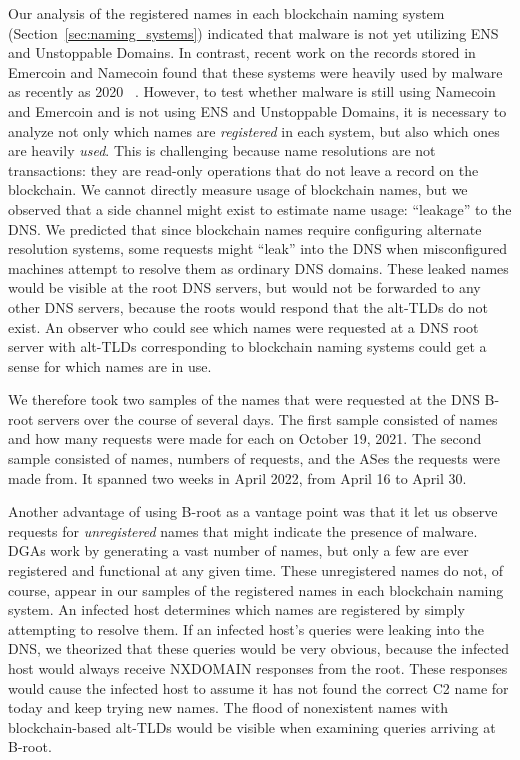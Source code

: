 Our analysis of the registered names in each blockchain naming system 
(Section~\ref{sec:naming_systems}) indicated that malware is not yet utilizing 
ENS and Unstoppable Domains. In contrast, recent work on the 
records stored in 
Emercoin and Namecoin found that these systems were heavily 
used by malware as recently as 2020 
~\cite{casino_unearthing_2021}. 
However, to test whether malware is still using Namecoin and Emercoin and is 
not using ENS and Unstoppable Domains, it is necessary to 
analyze not only which names are 
\emph{registered} in each system, but also which ones are 
heavily
\emph{used}.
This is challenging because name resolutions are not 
transactions: they are read-only operations that do not leave 
a record on the blockchain. We cannot directly measure 
usage of blockchain names, but we observed that a side 
channel might exist to estimate name usage: ``leakage'' to the DNS. We 
predicted that since blockchain names require configuring alternate resolution 
systems, some requests might ``leak'' into the DNS when misconfigured machines 
attempt to resolve them as ordinary DNS domains. These leaked 
names would be visible at the root DNS servers, but would not 
be forwarded to any other DNS servers, because the roots 
would respond that the alt-TLDs do not exist. An observer who could see which 
names were requested at a DNS root server with alt-TLDs corresponding to 
blockchain naming systems could get a sense for which names are in use.

We therefore took two samples of the names that were requested at the DNS 
B-root servers over the course of several days. The first 
sample consisted 
of names and how many requests were made for each on October 19, 2021. 
The second sample consisted of names, numbers of requests, and the ASes the 
requests were made from. It spanned two weeks in April 2022, from April 16 to 
April 30. 

%
Another advantage of using B-root as a vantage point was 
that it let us observe requests for \emph{unregistered} names 
that might indicate the presence of malware. DGAs work by 
generating a vast number 
of names, but only a few are ever registered and functional at any given time. 
These unregistered names do not, of course, appear in our samples of the 
registered names in each blockchain naming system. An infected host determines 
which names are registered by simply attempting to resolve them. If an infected 
host's queries were leaking into the DNS, we theorized that these queries would 
be very obvious, because the infected host would always receive NXDOMAIN 
responses from the root. These responses would cause the infected host to 
assume it has not 
found the correct C2 name for today and keep trying new 
names. The flood of nonexistent names with blockchain-based 
alt-TLDs would be visible when examining queries arriving at B-root. 

